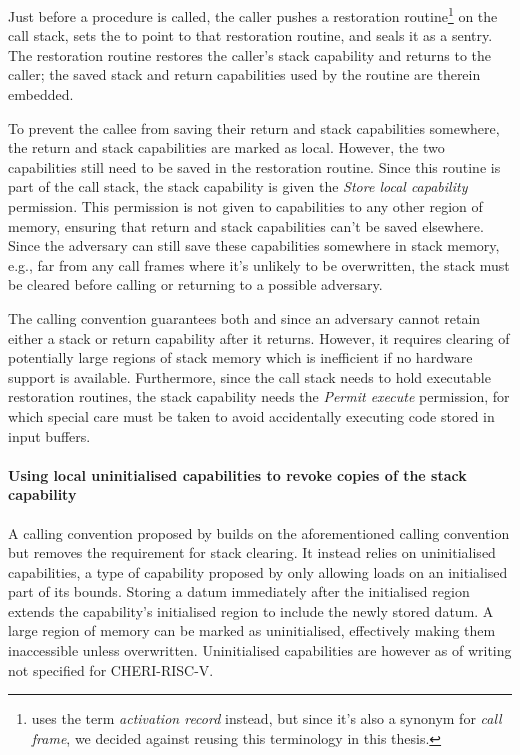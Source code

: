 \documentclass[main.tex]{subfiles}
\begin{document}
Just before a procedure is called, the caller pushes a restoration routine\footnote{\cite{retptr} uses the term \emph{activation record} instead, but since it's also a synonym for \emph{call frame}, we decided against reusing this terminology in this thesis.} on the call stack, sets the  to point to that restoration routine, and seals it as a \gls{sentry}. The restoration routine restores the caller's stack capability and returns to the caller; the saved stack and return capabilities used by the routine are therein embedded.

To prevent the callee from saving their return and stack capabilities somewhere, the return and stack capabilities are marked as local. However, the two capabilities still need to be saved in the restoration routine. Since this routine is part of the call stack, the stack capability is given the \emph{Store local capability} permission. This permission is not given to capabilities to any other region of memory, ensuring that return and stack capabilities can't be saved elsewhere. Since the adversary can still save these capabilities somewhere in stack memory, e.g., far from any call frames where it's unlikely to be overwritten, the stack must be cleared before calling or returning to a possible adversary.

The calling convention guarantees both  and  since an adversary cannot retain either a stack or return capability after it returns. However, it requires clearing of potentially large regions of stack memory which is inefficient if no hardware support is available. Furthermore, since the call stack needs to hold executable restoration routines, the stack capability needs the \emph{Permit execute} permission, for which special care must be taken to avoid accidentally executing code stored in input buffers.

\paragraph{Using local uninitialised capabilities to revoke copies of the stack capability} A calling convention proposed by \cite{uninitcapss,uninitcaps} builds on the aforementioned calling convention but removes the requirement for stack clearing. It instead relies on uninitialised capabilities, a type of capability proposed by \cite{uninitcapss} only allowing loads on an initialised part of its bounds. Storing a datum immediately after the initialised region extends the capability's initialised region to include the newly stored datum. A large region of memory can be marked as uninitialised, effectively making them inaccessible unless overwritten. Uninitialised capabilities are however as of writing not specified for CHERI-RISC-V.
\end{document}
